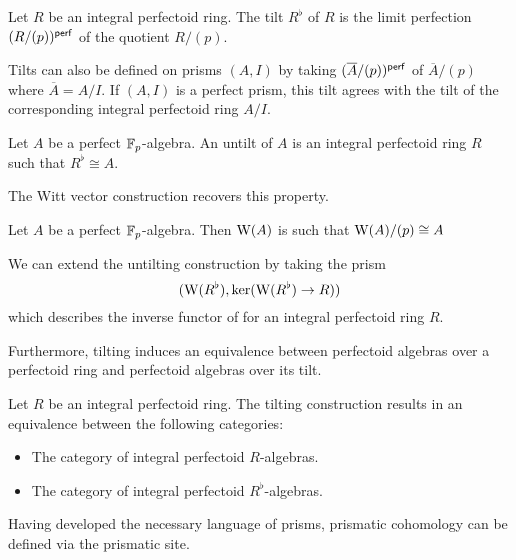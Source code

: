 \begin{definition}[Tilt]\label{def: tilt}
    Let $R$ be an integral perfectoid ring. The tilt $R^{\flat}$ of $R$ is the limit perfection $(R/(p))^{\mathsf{perf}}$ of the quotient $R/(p)$. 
\end{definition}
\begin{remark}
    Tilts can also be defined on prisms $(A,I)$ by taking $(\overline{A}/(p))^{\mathsf{perf}}$ of $\overline{A}/(p)$ where $\overline{A}=A/I$. If $(A,I)$ is a perfect prism, this tilt agrees with the tilt of the corresponding integral perfectoid ring $A/I$.
\end{remark}
\begin{definition}[Untilt]\label{def: untilt}
    Let $A$ be a perfect $\mathbb{F}_{p}$-algebra. An untilt of $A$ is an integral perfectoid ring $R$ such that $R^{\flat}\cong A$. 
\end{definition}
The Witt vector construction recovers this property. 
\begin{proposition}\label{prop: untilt is Witt vectors}
    Let $A$ be a perfect $\mathbb{F}_{p}$-algebra. Then $\mathrm{W}(A)$ is such that $\mathrm{W}(A)/(p)\cong A$
\end{proposition}
We can extend the untilting construction by taking the prism 
$$(\mathrm{W}(R^{\flat}), \ker(\mathrm{W}(R^{\flat})\to R))$$ 
which describes the inverse functor of  for an integral perfectoid ring $R$. 

Furthermore, tilting induces an equivalence between perfectoid algebras over a perfectoid ring and perfectoid algebras over its tilt. 
\begin{proposition}\label{prop: tilting correspondence}
    Let $R$ be an integral perfectoid ring. The tilting construction results in an equivalence between the following categories:
    \begin{itemize}
        \item The category of integral perfectoid $R$-algebras. 
        \item The category of integral perfectoid $R^{\flat}$-algebras. 
    \end{itemize}
\end{proposition}
Having developed the necessary language of prisms, prismatic cohomology can be defined via the prismatic site. 